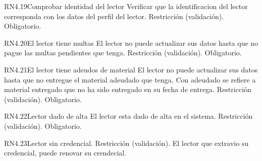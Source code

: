 
\begin{BussinesRule}{RN4.19}{Comprobar identidad del lector } 
	\BRitem[Descripción:] Verificar que la identificacion del lector corresponda con los datos del perfil del lector.
	\BRitem[Tipo:] Restricción (validación).
	\BRitem[Nivel:] Obligatorio.
\end{BussinesRule}


\begin{BussinesRule}{RN4.20}{El lector tiene multas} 
	\BRitem[Descripción:] El lector no puede actualizar sus datos hasta que no pague las multas pendientes que tenga.
	\BRitem[Tipo:] Restricción (validación).
	\BRitem[Nivel:] Obligatorio.
\end{BussinesRule}


\begin{BussinesRule}{RN4.21}{El lector tiene adeudos de material} 
	\BRitem[Descripción:] El lector no puede actualizar sus datos hasta que no entregue el material adeudado que tenga. Con adeudado se refiere a material entregado que no ha sido entregado en su fecha de entrega.
	\BRitem[Tipo:] Restricción (validación).
	\BRitem[Nivel:] Obligatorio.
\end{BussinesRule}


\begin{BussinesRule}{RN4.22}{Lector dado de alta} 
	\BRitem[Descripción:] El lector esta dado de alta en el sistema.
	\BRitem[Tipo:] Restricción (validación).
	\BRitem[Nivel:] Obligatorio.
\end{BussinesRule}


\begin{BussinesRule}{RN4.23}{Lector sin credencial.}
	\BRitem[Tipo:] Restricción (validación).
	\BRitem[Descripción:] El lector que extravio su credencial, puede renovar su crendecial.
\end{BussinesRule}



